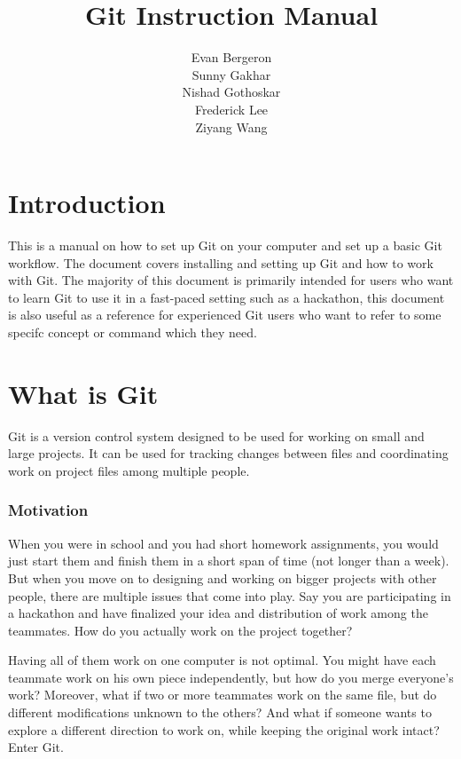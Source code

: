 \documentclass[12pt]{report}
\title{Git Instruction Manual}
\author{Evan Bergeron\\
Sunny Gakhar\\
Nishad Gothoskar\\
Frederick Lee\\
Ziyang Wang
}
\renewcommand\section[1]{{\chapter{#1}}}
\begin{document}
\maketitle

\tableofcontents
\newpage
\section{Introduction}

This is a manual on how to set up Git on your computer and set up a basic Git workflow. The document covers installing and setting up Git and how to work with Git. The majority of this document is primarily intended for users who want to learn Git to use it in a fast-paced setting such as a hackathon, this document is also useful as a reference for experienced Git users who want to refer to some specifc concept or command which they need.

\section{What is Git}

Git is a version control system designed to be used for working on small and large projects. It can be used for tracking changes between files and coordinating work on project files among multiple people.

\subsection{Motivation}
When you were in school and you had short homework assignments, you would just start them and finish them in a short span of time (not longer than a week). But when you move on to designing and working on bigger projects with other people, there are multiple issues that come into play. Say you are participating in a hackathon and have finalized your idea and distribution of work among the teammates. How do you actually work on the project together? 

Having all of them work on one computer is not optimal. You might have each teammate work on his own piece independently, but how do you merge everyone's work? Moreover, what if two or more teammates work on the same file, but do different modifications unknown to the others? And what if someone wants to explore a different direction to work on, while keeping the original work intact? Enter Git.
\end{document}
